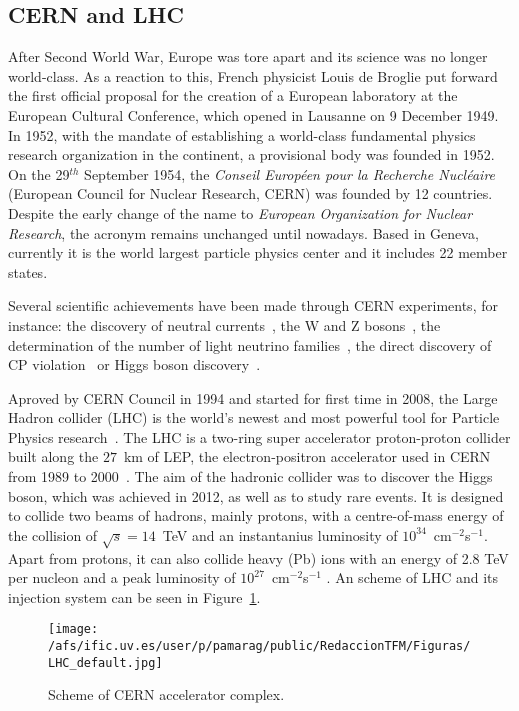\subsection{CERN and LHC} \label{subsec:LHC}
After Second World War, Europe was tore apart and its science was no longer world-class. As a reaction to this, French physicist Louis de Broglie put forward the first official proposal for the creation of a European laboratory at the European Cultural Conference, which opened in Lausanne on 9 December 1949. In 1952, with the mandate of establishing a world-class fundamental physics research organization in the continent, a provisional body was founded in 1952. On the 29$^{th}$ September 1954, the \textit{Conseil Européen pour la Recherche Nucléaire} (European Council for Nuclear Research, CERN) was founded by 12 countries. Despite the early change of the name to \textit{European Organization for Nuclear Research}, the acronym remains unchanged until nowadays. Based in Geneva, currently it is the world largest particle physics center and it includes 22 member states.

Several scientific achievements have been made through CERN experiments, for instance: the discovery of neutral currents~\cite{hasert1974observation}, the W and Z bosons~\cite{Watkins:1986va}, the determination of the number of light neutrino families~\cite{decamp1989determination}, the direct discovery of CP violation~\cite{Fanti:1999nm} or Higgs boson discovery~\cite{Carmi:2012in}.

Aproved by CERN Council in 1994 and started for first time in 2008, the Large Hadron collider (LHC) is the world's newest and most powerful tool for Particle Physics research~\cite{Evans:2008zzb}. The LHC is a two-ring super accelerator proton-proton collider built along the $27$~km of LEP, the electron-positron accelerator used in CERN from 1989 to 2000~\cite{Myers:1991ym}. The aim of the hadronic collider was to discover the Higgs boson, which was achieved in 2012, as well as to study rare events. 
It is designed to collide two beams of hadrons, mainly protons,
with a centre-of-mass energy of the collision of $\sqrt{s}=14$~TeV and an instantanius luminosity of $10^{34}$~cm$^{-2}$s$^{-1}$. Apart from protons, it can also collide heavy (Pb) ions with an energy of 2.8 TeV per nucleon and a peak luminosity of $10^{27}$~cm$^{-2}$s$^{-1}$ \cite{muller2012first}. An scheme of LHC and its injection system can be seen in Figure~\ref{Fig:LHC}.

\begin{figure}[htb]
\centering
\texttt{[image: /afs/ific.uv.es/user/p/pamarag/public/RedaccionTFM/Figuras/LHC\_default.jpg]}
\caption{Scheme of CERN accelerator complex.}
\label{Fig:LHC}
\end{figure}


